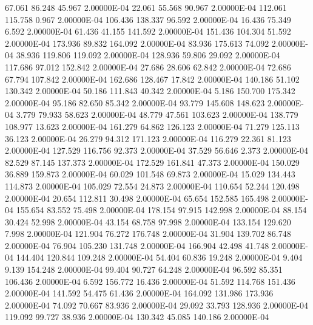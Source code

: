     67.061    86.248    45.967  2.00000E-04
    22.061    55.568    90.967  2.00000E-04
   112.061   115.758     0.967  2.00000E-04
   106.436   138.337    96.592  2.00000E-04
    16.436    75.349     6.592  2.00000E-04
    61.436    41.155   141.592  2.00000E-04
   151.436   104.304    51.592  2.00000E-04
   173.936    89.832   164.092  2.00000E-04
    83.936   175.613    74.092  2.00000E-04
    38.936   119.806   119.092  2.00000E-04
   128.936    59.806    29.092  2.00000E-04
   117.686    97.012   152.842  2.00000E-04
    27.686    28.606    62.842  2.00000E-04
    72.686    67.794   107.842  2.00000E-04
   162.686   128.467    17.842  2.00000E-04
   140.186    51.102   130.342  2.00000E-04
    50.186   111.843    40.342  2.00000E-04
     5.186   150.700   175.342  2.00000E-04
    95.186    82.650    85.342  2.00000E-04
    93.779   145.608   148.623  2.00000E-04
     3.779    79.933    58.623  2.00000E-04
    48.779    47.561   103.623  2.00000E-04
   138.779   108.977    13.623  2.00000E-04
   161.279    64.862   126.123  2.00000E-04
    71.279   125.113    36.123  2.00000E-04
    26.279    94.312   171.123  2.00000E-04
   116.279    22.361    81.123  2.00000E-04
   127.529   116.756    92.373  2.00000E-04
    37.529    56.646     2.373  2.00000E-04
    82.529    87.145   137.373  2.00000E-04
   172.529   161.841    47.373  2.00000E-04
   150.029    36.889   159.873  2.00000E-04
    60.029   101.548    69.873  2.00000E-04
    15.029   134.443   114.873  2.00000E-04
   105.029    72.554    24.873  2.00000E-04
   110.654    52.244   120.498  2.00000E-04
    20.654   112.811    30.498  2.00000E-04
    65.654   152.585   165.498  2.00000E-04
   155.654    83.552    75.498  2.00000E-04
   178.154    97.915   142.998  2.00000E-04
    88.154    30.424    52.998  2.00000E-04
    43.154    68.758    97.998  2.00000E-04
   133.154   129.620     7.998  2.00000E-04
   121.904    76.272   176.748  2.00000E-04
    31.904   139.702    86.748  2.00000E-04
    76.904   105.230   131.748  2.00000E-04
   166.904    42.498    41.748  2.00000E-04
   144.404   120.844   109.248  2.00000E-04
    54.404    60.836    19.248  2.00000E-04
     9.404     9.139   154.248  2.00000E-04
    99.404    90.727    64.248  2.00000E-04
    96.592    85.351   106.436  2.00000E-04
     6.592   156.772    16.436  2.00000E-04
    51.592   114.768   151.436  2.00000E-04
   141.592    54.475    61.436  2.00000E-04
   164.092   131.986   173.936  2.00000E-04
    74.092    70.667    83.936  2.00000E-04
    29.092    33.793   128.936  2.00000E-04
   119.092    99.727    38.936  2.00000E-04
   130.342    45.085   140.186  2.00000E-04
